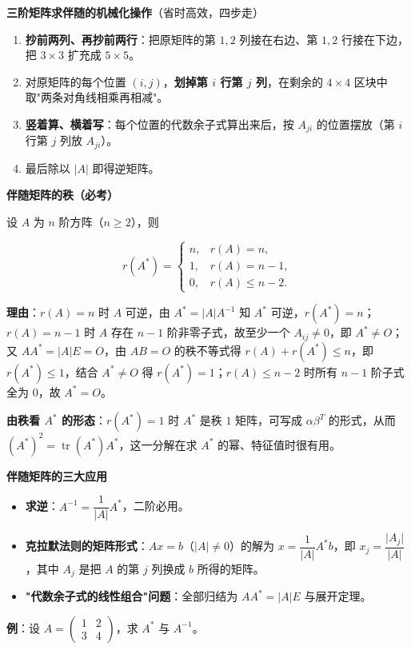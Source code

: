 \documentclass[11pt,openany,UTF8]{ctexbook}
\begin{document}
\textbf{三阶矩阵求伴随的机械化操作}（省时高效，四步走）

\begin{enumerate}
\item \textbf{抄前两列、再抄前两行}：把原矩阵的第 $1,2$ 列接在右边、第 $1,2$ 行接在下边，把 $3\times3$ 扩充成 $5\times5$。
\item 对原矩阵的每个位置 $(i,j)$，\textbf{划掉第 $i$ 行第 $j$ 列}，在剩余的 $4\times4$ 区块中取"两条对角线相乘再相减"。
\item \textbf{竖着算、横着写}：每个位置的代数余子式算出来后，按 $A_{ji}$ 的位置摆放（第 $i$ 行第 $j$ 列放 $A_{ji}$）。
\item 最后除以 $\vert A\vert$ 即得逆矩阵。
\end{enumerate}
\textbf{伴随矩阵的秩（必考）}

设 $A$ 为 $n$ 阶方阵（$n\ge2$），则

\[r(A^*)=\begin{cases}n, & r(A)=n,\\1, & r(A)=n-1,\\0, & r(A)\le n-2.\end{cases}\]

\textbf{理由}：$r(A)=n$ 时 $A$ 可逆，由 $A^*=\vert A\vert A^{-1}$ 知 $A^*$ 可逆，$r(A^*)=n$；$r(A)=n-1$ 时 $A$ 存在 $n-1$ 阶非零子式，故至少一个 $A_{ij}\ne0$，即 $A^*\ne O$；又 $AA^*=\vert A\vert E=O$，由 $AB=O$ 的秩不等式得 $r(A)+r(A^*)\le n$，即 $r(A^*)\le1$，结合 $A^*\ne O$ 得 $r(A^*)=1$；$r(A)\le n-2$ 时所有 $n-1$ 阶子式全为 $0$，故 $A^*=O$。

\textbf{由秩看 $A^*$ 的形态}：$r(A^*)=1$ 时 $A^*$ 是秩 $1$ 矩阵，可写成 $\alpha\beta^T$ 的形式，从而 $(A^*)^2=\operatorname{tr}(A^*)A^*$，这一分解在求 $A^*$ 的幂、特征值时很有用。

\textbf{伴随矩阵的三大应用}

\begin{itemize}
\item \textbf{求逆}：$A^{-1}=\dfrac{1}{\vert A\vert}A^*$，二阶必用。
\item \textbf{克拉默法则的矩阵形式}：$Ax=b$（$\vert A\vert\ne0$）的解为 $x=\dfrac{1}{\vert A\vert}A^*b$，即 $x_j=\dfrac{\vert A_j\vert}{\vert A\vert}$，其中 $A_j$ 是把 $A$ 的第 $j$ 列换成 $b$ 所得的矩阵。
\item \textbf{"代数余子式的线性组合"问题}：全部归结为 $AA^*=\vert A\vert E$ 与展开定理。
\end{itemize}
\textbf{例}：设 $A=\begin{pmatrix}1&2\\3&4\end{pmatrix}$，求 $A^*$ 与 $A^{-1}$。
\end{document}
